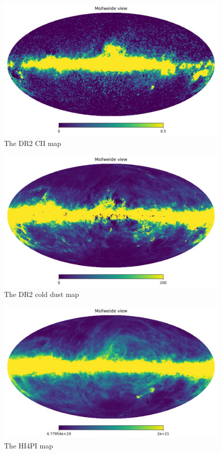 \documentclass{aa}
\begin{document}
\begin{figure}
  \centering
  \includegraphics[width=\columnwidth]{figures/cii_DR2.png}
  \caption{The DR2 CII map}
  \label{fig:cii_DR2}
\end{figure}
\begin{figure}
  \centering
  \includegraphics[width=\columnwidth]{figures/cold_dust.png}
  \caption{The DR2 cold dust map}
  \label{fig:cold_dust}
\end{figure}
\begin{figure}
  \centering
  \includegraphics[width=\columnwidth]{figures/h14pi.png}
  \caption{The HI4PI map}
  \label{fig:h14pi}
\end{figure}
\end{document}
